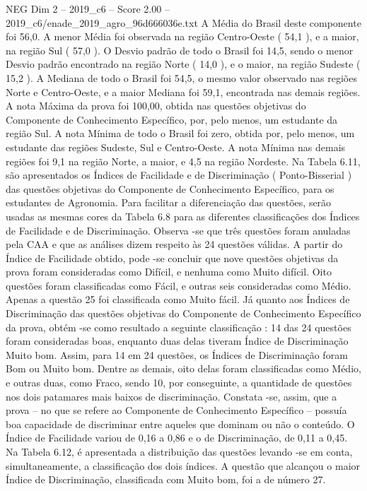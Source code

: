 \begin{textsample}{NEG Dim 2 – 2019\_c6 – Score 2.00 – 2019\_c6/enade\_2019\_agro\_96d666036e.txt}
A Média do Brasil deste componente foi 56,0.
A menor Média foi observada na região Centro-Oeste ( 54,1 ), e a maior, na região Sul ( 57,0 ).
O Desvio padrão de todo o Brasil foi 14,5, sendo o menor Desvio padrão encontrado na região Norte ( 14,0 ), e o maior, na região Sudeste ( 15,2 ).
A Mediana de todo o Brasil foi 54,5, o mesmo valor observado nas regiões Norte e Centro-Oeste, e a maior Mediana foi 59,1, encontrada nas demais regiões.
A nota Máxima da prova foi 100,00, obtida nas questões objetivas do Componente de Conhecimento Específico, por, pelo menos, um estudante da região Sul.
A nota Mínima de todo o Brasil foi zero, obtida por, pelo menos, um estudante das regiões Sudeste, Sul e Centro-Oeste.
A nota Mínima nas demais regiões foi 9,1 na região Norte, a maior, e 4,5 na região Nordeste.
Na Tabela 6.11, são apresentados os Índices de Facilidade e de Discriminação ( Ponto-Bisserial ) das questões objetivas do Componente de Conhecimento Específico, para os estudantes de Agronomia.
Para facilitar a diferenciação das questões, serão usadas as mesmas cores da Tabela 6.8 para as diferentes classificações dos Índices de Facilidade e de Discriminação.
Observa -se que três questões foram anuladas pela CAA e que as análises dizem respeito às 24 questões válidas.
A partir do Índice de Facilidade obtido, pode -se concluir que nove questões objetivas da prova foram consideradas como Difícil, e nenhuma como Muito difícil.
Oito questões foram classificadas como Fácil, e outras seis consideradas como Médio.
Apenas a questão 25 foi classificada como Muito fácil.
Já quanto aos Índices de Discriminação das questões objetivas do Componente de Conhecimento Específico da prova, obtém -se como resultado a seguinte classificação : 14 das 24 questões foram consideradas boas, enquanto duas delas tiveram Índice de Discriminação Muito bom.
Assim, para 14 em 24 questões, os Índices de Discriminação foram Bom ou Muito bom.
Dentre as demais, oito delas foram classificadas como Médio, e outras duas, como Fraco, sendo 10, por conseguinte, a quantidade de questões nos dois patamares mais baixos de discriminação.
Constata -se, assim, que a prova – no que se refere ao Componente de Conhecimento Específico – possuía boa capacidade de discriminar entre aqueles que dominam ou não o conteúdo.
O Índice de Facilidade variou de 0,16 a 0,86 e o de Discriminação, de 0,11 a 0,45.
Na Tabela 6.12, é apresentada a distribuição das questões levando -se em conta, simultaneamente, a classificação dos dois índices.
A questão que alcançou o maior Índice de Discriminação, classificada com Muito bom, foi a de número 27.

\end{textsample}
